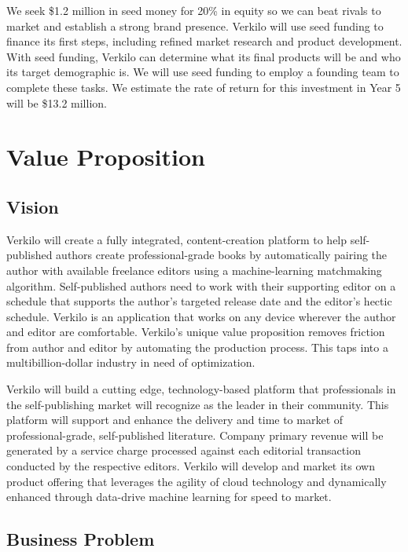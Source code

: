 \documentclass[10pt,openany]{book}
\begin{document}
We seek \$1.2 million in seed money for 20\% in equity so we can beat
rivals to market and establish a strong brand presence. Verkilo will use
seed funding to finance its first steps, including refined market
research and product development. With seed funding, Verkilo can
determine what its final products will be and who its target demographic
is. We will use seed funding to employ a founding team to complete these
tasks. We estimate the rate of return for this investment in Year 5 will
be \$13.2 million.


\hypertarget{value-proposition}{%
\chapter{Value Proposition}\label{value-proposition}}

\hypertarget{vision}{%
\section{Vision}\label{vision}}

Verkilo will create a fully integrated, content-creation platform to
help self-published authors create professional-grade books by
automatically pairing the author with available freelance editors using
a machine-learning matchmaking algorithm. Self-published authors need to
work with their supporting editor on a schedule that supports the
author's targeted release date and the editor's hectic schedule. Verkilo
is an application that works on any device wherever the author and
editor are comfortable. Verkilo's unique value proposition removes
friction from author and editor by automating the production process.
This taps into a multibillion-dollar industry in need of optimization.

Verkilo will build a cutting edge, technology-based platform that
professionals in the self-publishing market will recognize as the leader
in their community. This platform will support and enhance the delivery
and time to market of professional-grade, self-published literature.
Company primary revenue will be generated by a service charge processed
against each editorial transaction conducted by the respective editors.
Verkilo will develop and market its own product offering that leverages
the agility of cloud technology and dynamically enhanced through
data-drive machine learning for speed to market.

\hypertarget{business-problem}{%
\section{Business Problem}\label{business-problem}}
\end{document}
